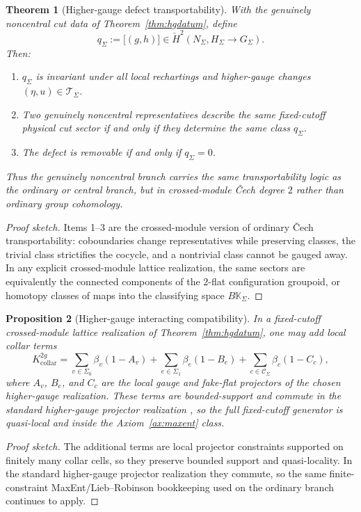 \documentclass[11pt]{article}
\newtheorem{theorem}{Theorem}[section]
\newtheorem{proposition}[theorem]{Proposition}
\begin{document}
\begin{theorem}[Higher-gauge defect transportability]\label{thm:hgtransport}
With the genuinely noncentral cut data of Theorem~\ref{thm:hgdatum}, define
\[
q_\Sigma:=\bigl[(g,h)\bigr]\in \check H^2(N_\Sigma,H_\Sigma\to G_\Sigma).
\]
Then:
\begin{enumerate}[leftmargin=2em]
\item \(q_\Sigma\) is invariant under all local rechartings and higher-gauge changes \((\eta,u)\in \mathcal T_\Sigma\).
\item Two genuinely noncentral representatives describe the same fixed-cutoff physical cut sector if and only if they determine the same class \(q_\Sigma\).
\item The defect is removable if and only if \(q_\Sigma=0\).
\end{enumerate}
Thus the genuinely noncentral branch carries the same transportability logic as the ordinary or central branch, but in crossed-module \v{C}ech degree \(2\) rather than ordinary group cohomology.
\end{theorem}

\begin{proof}[Proof sketch]
Items 1--3 are the crossed-module version of ordinary \v{C}ech transportability: coboundaries
change representatives while preserving classes, the trivial class strictifies the cocycle, and a
nontrivial class cannot be gauged away. In any explicit crossed-module lattice realization, the
same sectors are equivalently the connected components of the \(2\)-flat configuration groupoid,
or homotopy classes of maps into the classifying space \(B\mathbb K_\Sigma\).
\end{proof}

\begin{proposition}[Higher-gauge interacting compatibility]\label{prop:hginteracting}
In a fixed-cutoff crossed-module lattice realization of Theorem~\ref{thm:hgdatum}, one may add local collar terms
\[
K_{\mathrm{collar}}^{2g}
=
\sum_{v\in\Sigma_0}\beta_v(1-A_v)
+
\sum_{e\in\Sigma_1}\beta_e(1-B_e)
+
\sum_{c\in\mathcal C_\Sigma}\beta_c(1-C_c),
\]
where \(A_v\), \(B_e\), and \(C_c\) are the local gauge and fake-flat projectors of the chosen higher-gauge realization. These terms are bounded-support and commute in the standard higher-gauge projector realization \cite{bullivant17}, so the full fixed-cutoff generator is quasi-local and inside the Axiom~\ref{ax:maxent} class.
\end{proposition}

\begin{proof}[Proof sketch]
The additional terms are local projector constraints supported on finitely many collar cells, so they preserve bounded support and quasi-locality. In the standard higher-gauge projector realization they commute, so the same finite-constraint MaxEnt/Lieb--Robinson bookkeeping used on the ordinary branch continues to apply.
\end{proof}
\end{document}
